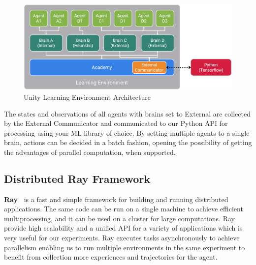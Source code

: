 \begin{figure}[!htb]
	\centering
	\includegraphics[width=\linewidth]{figures/unity_api.png}
	\caption{Unity Learning Environment Architecture}
	\label{fig:unity_api}
\end{figure}

The states and observations of all agents with brains set to External are collected by the External Communicator and communicated to our Python API for processing using your ML library of choice. By setting multiple agents to a single brain, actions can be decided in a batch fashion, opening the possibility of getting the advantages of parallel computation, when supported.


\subsection{Distributed Ray Framework}

\textbf{Ray~\parencite{moritz2018ray}} is a fast and simple framework for building and running distributed applications. The same code can be run on a single machine to achieve efficient multiprocessing, and it can be used on a cluster for large computations. Ray provide high scalability and a unified API for a variety of applications which is very useful for our experiments. Ray executes tasks asynchronously to achieve parallelism enabling us to run multiple environments in the same experiment to benefit from collection more experiences and trajectories for the agent.

